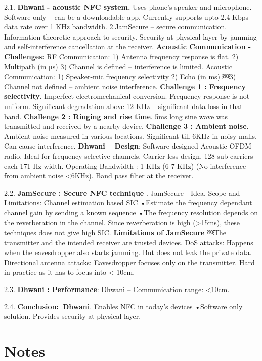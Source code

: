 \documentclass[9pt]{extarticle}
\begin{document}
\begin{multicols}{2}
2.1. \textbf{Dhwani - acoustic NFC system.} Uses phone’s speaker and microphone. Software only – can be a downloadable app. Currently supports upto 2.4 Kbps data rate over 1 KHz bandwidth. 2.JamSecure – secure communication. Information-theoretic approach to security. Security at physical layer by jamming and self-interference cancellation at the receiver. \textbf{Acoustic Communication - Challenges:} RF Communication: 1) Antenna frequency response is flat. 2) Multipath (in μs) 3) Channel is defined – interference is limited. Acoustic Communication: 1) Speaker-mic frequency selectivity 2) Echo (in ms) ￼3) Channel not defined – ambient noise interference. \textbf{Challenge 1 : Frequency selectivity}. Imperfect electromechanical conversion. Frequency response is not uniform. Significant degradation above 12 KHz – significant data loss in that band. \textbf{Challenge 2 : Ringing and rise time}. 5ms long sine wave was transmitted and received by a nearby device. \textbf{Challenge 3 : Ambient noise}. Ambient noise measured in various locations. Significant till 6KHz in noisy malls. Can cause interference. \textbf{Dhwani – Design}: Software designed Acoustic OFDM radio. Ideal for frequency selective channels. Carrier-less design. 128 sub-carriers each 171 Hz width. Operating Bandwidth : 1 KHz (6-7 KHz) (No interference from ambient noise <6KHz). Band pass filter at the receiver.

2.2. \textbf{JamSecure : Secure NFC technique} . JamSecure - Idea. Scope and Limitations: Channel estimation based SIC
•Estimate the frequency dependant channel gain by sending a known sequence
•The frequency resolution depends on the reverberation in the channel. Since reverberation is high (>15ms), these techniques does not give high SIC. \textbf{Limitations of JamSecure} ￼The transmitter and the intended receiver are trusted devices.
DoS attacks: Happens when the eavesdropper also starts jamming. But does not leak the private data. Directional antenna attacks: Eavesdropper focuses only on the transmitter. Hard in practice as it has to focus into < 10cm.

2.3. \textbf{Dhwani : Performance}: Dhwani – Communication range:  <10cm. 

2.4. \textbf{Conclusion:\ Dhwani}. Enables NFC in today’s devices •Software only solution. Provides security at physical layer.

\section{Notes}


\end{multicols}
\end{document}
